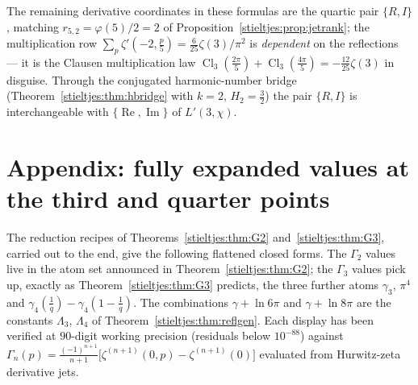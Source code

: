 \begin{remark}
The remaining derivative coordinates in these formulas are the quartic pair $\{R,I\}$,
matching $r_{5,2}=\varphi(5)/2=2$ of Proposition~\ref{stieltjes:prop:jetrank}; the
multiplication row $\sum_p\zeta'(-2,\tfrac p5)=\tfrac6{25}\zeta(3)/\pi^2$
is \emph{dependent} on the reflections — it is the Clausen multiplication
law $\operatorname{Cl}_3(\tfrac{2\pi}5)
+\operatorname{Cl}_3(\tfrac{4\pi}5)=-\tfrac{12}{25}\zeta(3)$ in disguise.
Through the conjugated harmonic-number bridge
(Theorem~\ref{stieltjes:thm:hbridge} with $k=2$, $H_2=\tfrac32$) the pair $\{R,I\}$
is interchangeable with $\{\operatorname{Re},\operatorname{Im}\}$ of
$L'(3,\chi)$.
\end{remark}















\section*{Appendix: fully expanded values at the third and quarter points}

The reduction recipes of Theorems~\ref{stieltjes:thm:G2} and~\ref{stieltjes:thm:G3}, carried out
to the end, give the following flattened closed forms. The $\Gamma_{\!2}$
values live in the atom set announced in Theorem~\ref{stieltjes:thm:G2}; the
$\Gamma_{\!3}$ values pick up, exactly as Theorem~\ref{stieltjes:thm:G3} predicts, the
three further atoms $\gamma_3$, $\pi^4$ and
$\gamma_{4}(\tfrac1q)-\gamma_{4}(1-\tfrac1q)$. The combinations
$\gamma+\ln 6\pi$ and $\gamma+\ln 8\pi$ are the constants $\Lambda_3$, $\Lambda_4$ of
Theorem~\ref{stieltjes:thm:reflgen}. Each display has been verified at $90$-digit
working precision (residuals below $10^{-88}$) against
$\Gamma_{\!n}(p)=\frac{(-1)^{n+1}}{n+1}\bigl[\zeta^{(n+1)}(0,p)-\zeta^{(n+1)}(0)\bigr]$
evaluated from Hurwitz-zeta derivative jets.

